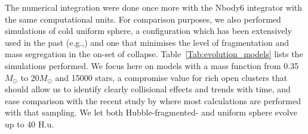 The numerical integration were done once more with the Nbody6 integrator with the same computational units. For comparison purposes, we also performed simulations of cold uniform sphere, a configuration which has been extensively used  in the past (e.g.,\citealt{Theis1999,Boily2002,Barnes2009,Caputo2014,Benhaiem2015}) and one that minimises the level of fragmentation and mass segregation in the on-set of collapse. Table~\ref{Tab:evolution_models} lists the simulations performed. We focus here on models with a mass function from 0.35$M_\odot$ to 20$M_\odot$ and 15000 stars, a compromise value for rich open clusters that should allow us to identify clearly collisional effects and trends with time, and ease comparison with the recent study by \cite{Caputo2014} where most calculations are performed with that sampling. We let both Hubble-fragmented- and uniform sphere evolve up to 40 H.u. 





